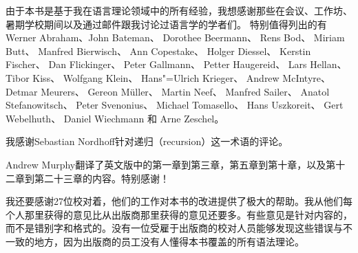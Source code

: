 由于本书是基于我在语言理论领域中的所有经验，我想感谢那些在会议、工作坊、暑期学校期间以及通过邮件跟我讨论过语言学的学者们。
特别值得列出的有Werner Abraham、John Bateman、
Dorothee Beermann、
Rens Bod、
Miriam Butt、
Manfred Bierwisch、
Ann Copestake、
Holger Diessel、
Kerstin Fischer、
Dan Flickinger、
Peter Gallmann、
Petter Haugereid、
Lars Hellan、
Tibor Kiss、
Wolfgang Klein、 
Hans"=Ulrich Krieger、
Andrew McIntyre、
Detmar Meurers、
Gereon Müller、
Martin Neef、
Manfred Sailer、 
Anatol Stefanowitsch、
Peter Svenonius、
Michael Tomasello、 
Hans Uszkoreit、
Gert Webelhuth、
Daniel Wiechmann 
和
Arne Zeschel。

我感谢Sebastian Nordhoff针对递归（recursion）这一术语的评论。

Andrew Murphy翻译了英文版中的第一章到第三章，第五章到第十章，以及第十二章到第二十三章的内容。特别感谢！

我还要感谢27位校对着，他们的工作对本书的改进提供了极大的帮助。我从他们每个人那里获得的意见比从出版商那里获得的意见还要多。有些意见是针对内容的，而不是错别字和格式的。没有一位受雇于出版商的校对人员能够发现这些错误与不一致的地方，因为出版商的员工没有人懂得本书覆盖的所有语法理论。

